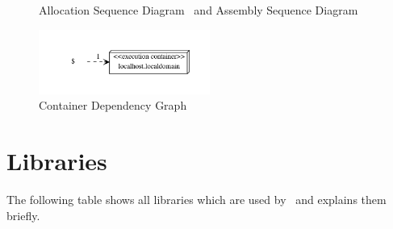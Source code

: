 	\begin{figure}[H]\centering
	\caption{Allocation Sequence Diagram~ and Assembly Sequence Diagram~}
	\end{figure}
	
	\begin{figure}[H]
		\centering
		\includegraphics[width=0.5\textwidth]{images/containerDependencyGraph}
		\caption{Container Dependency Graph}
	\end{figure}
  
  
\newpage
  \section{Libraries}
    The following table shows all libraries which are used by \Kieker\ and explains them briefly.
    

